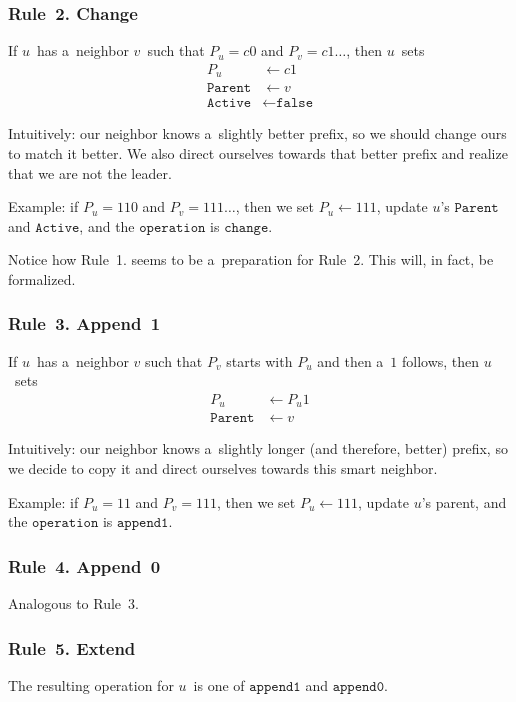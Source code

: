 \documentclass{article}
\begin{document}
\subsubsection*{Rule~2. Change}
If \(u\)~has a~neighbor \(v\)~such that \(P_u = c0\) and \(P_v = c1\ldots\), then \(u\)~sets
\begin{align*}
    P_u &\gets c1\\
    \texttt{Parent} &\gets v\\
    \texttt{Active} &\gets \texttt{false}
\end{align*}

Intuitively: our neighbor knows a~slightly better prefix, so we should change ours to match it better. We also direct ourselves towards that better prefix and realize that we are not the leader.

Example: if \(P_u = 110\) and \(P_v = 111\ldots\), then we set \(P_u \gets 111\), update \(u\)'s \(\texttt{Parent}\) and \(\texttt{Active}\), and the \(\texttt{operation}\) is \(\texttt{change}\).

Notice how Rule~1. seems to be a~preparation for Rule~2. This will, in fact, be formalized.

\subsubsection*{Rule~3. Append~1}
If \(u\)~has a~neighbor \(v\) such that \(P_v\) starts with \(P_u\) and then a~\(1\) follows, then \(u\)~sets
\begin{align*}
    P_u &\gets P_u1\\
    \texttt{Parent} &\gets v
\end{align*}

Intuitively: our neighbor knows a~slightly longer (and therefore, better) prefix, so we decide to copy it and direct ourselves towards this smart neighbor.

Example: if \(P_u = 11\) and \(P_v = 111\), then we set \(P_u \gets 111\), update \(u\)'s parent, and the \(\texttt{operation}\) is \(\texttt{append1}\).

\subsubsection*{Rule~4. Append~0}
Analogous to Rule~3.

\subsubsection*{Rule~5. Extend}
The resulting operation for \(u\)~is one of \(\texttt{append1}\) and \(\texttt{append0}\).
\end{document}
